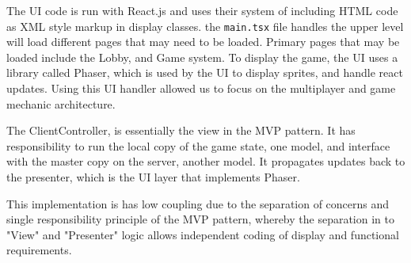 \documentclass[12pt]{report}
\begin{document}
The UI code is run with React.js and uses their system of including HTML code as XML style markup in display classes. the \texttt{main.tsx} file handles the upper level will load different pages that may need to be loaded. Primary pages that may be loaded include the Lobby, and Game system. To display the game, the UI uses a library called Phaser, which is used by the UI to display sprites, and handle react updates. Using this UI handler allowed us to focus on the multiplayer and game mechanic architecture. 

The ClientController, is essentially the view in the MVP pattern. It has responsibility to run the local copy of the game state, one model, and interface with the master copy on the server, another model. It propagates updates back to the presenter, which is the UI layer that implements Phaser. 

This implementation is has low coupling due to the separation of concerns and single responsibility principle of the MVP pattern, whereby the separation in to "View" and "Presenter" logic allows independent coding of display and functional requirements. 





\end{document}
